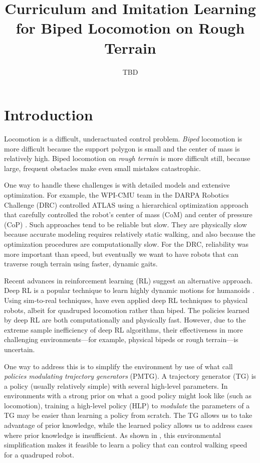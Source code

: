 \documentclass[a4paper]{article}
\title{Curriculum and Imitation Learning for Biped Locomotion on Rough Terrain}
\author{TBD}
\begin{document}
\maketitle

\section{Introduction}

Locomotion is a difficult, underactuated control problem.
\emph{Biped} locomotion is more difficult because the support polygon is small and the center of mass is relatively high.
Biped locomotion on \emph{rough terrain} is more difficult still, because large, frequent obstacles make even small mistakes catastrophic.

One way to handle these challenges is with detailed models and extensive optimization.
For example, the WPI-CMU team in the DARPA Robotics Challenge (DRC) controlled ATLAS using a hierarchical optimization approach that carefully controlled the robot's center of mass (CoM) and center of pressure (CoP) \citep{feng2015optimization}.
Such approaches tend to be reliable but slow.
They are physically slow because accurate modeling requires relatively static walking, and also because the optimization procedures are computationally slow.
For the DRC, reliability was more important than speed, but eventually we want to have robots that can traverse rough terrain using faster, dynamic gaits.

Recent advances in reinforcement learning (RL) suggest an alternative approach.
Deep RL is a popular technique to learn highly dynamic motions for humanoids \citep{peng2018deepmimic, heess2017emergence}.
Using sim-to-real techniques, \citet{tan2018sim} have even applied deep RL techniques to physical robots, albeit for quadruped locomotion rather than biped.
The policies learned by deep RL are both computationally and physically fast.
However, due to the extreme sample inefficiency of deep RL algorithms, their effectiveness in more challenging environments---for example, physical bipeds or rough terrain---is uncertain.

One way to address this is to simplify the environment by use of what \citet{iscen2018pmtg} call \emph{policies modulating trajectory generators} (PMTG).
A trajectory generator (TG) is a policy (usually relatively simple) with several high-level parameters.
In environments with a strong prior on what a good policy might look like (such as locomotion),
training a high-level policy (HLP) to \emph{modulate} the parameters of a TG may be easier than learning a policy from scratch.
The TG allows us to take advantage of prior knowledge, while the learned policy allows us to address cases where prior knowledge is insufficient.
As shown in \citet{iscen2018pmtg}, this environmental simplification makes it feasible to learn a policy that can control walking speed for a quadruped robot.
\end{document}

